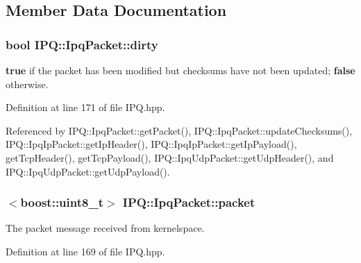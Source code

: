 \subsection{\-Member \-Data \-Documentation}
\hypertarget{classIPQ_1_1IpqPacket_a00acebf51531043a8536f20bb9412d61}{
\subsubsection[{dirty}]{\setlength{\rightskip}{0pt plus 5cm}bool {\bf \-I\-P\-Q\-::\-Ipq\-Packet\-::dirty}}}
\label{classIPQ_1_1IpqPacket_a00acebf51531043a8536f20bb9412d61}


{\bfseries true} if the packet has been modified but checksums have not been updated; {\bfseries false} otherwise. 



\-Definition at line 171 of file \-I\-P\-Q.\-hpp.



\-Referenced by \-I\-P\-Q\-::\-Ipq\-Packet\-::get\-Packet(), \-I\-P\-Q\-::\-Ipq\-Packet\-::update\-Checksums(), \-I\-P\-Q\-::\-Ipq\-Ip\-Packet\-::get\-Ip\-Header(), \-I\-P\-Q\-::\-Ipq\-Ip\-Packet\-::get\-Ip\-Payload(), get\-Tcp\-Header(), get\-Tcp\-Payload(), \-I\-P\-Q\-::\-Ipq\-Udp\-Packet\-::get\-Udp\-Header(), and \-I\-P\-Q\-::\-Ipq\-Udp\-Packet\-::get\-Udp\-Payload().

\hypertarget{classIPQ_1_1IpqPacket_a2bdf247f13a3e9f86e9e3846e6a9cb45}{
\subsubsection[{packet}]{$<$boost\-::uint8\-\_\-t$>$ {\bf \-I\-P\-Q\-::\-Ipq\-Packet\-::packet}}}
\label{classIPQ_1_1IpqPacket_a2bdf247f13a3e9f86e9e3846e6a9cb45}


\-The packet message received from kernelspace. 



\-Definition at line 169 of file \-I\-P\-Q.\-hpp.



